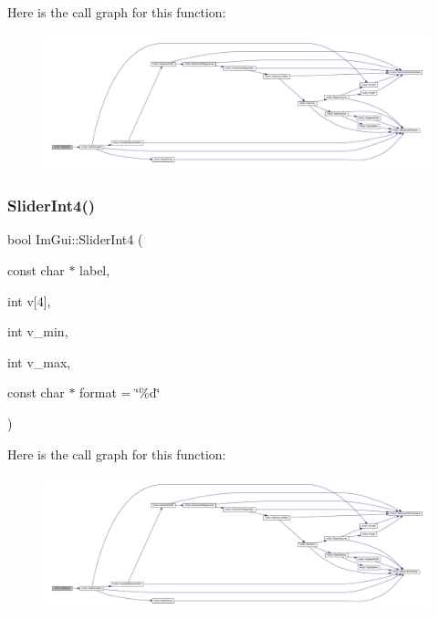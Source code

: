 Here is the call graph for this function\+:
\nopagebreak
\begin{figure}[H]
\begin{center}
\leavevmode
\includegraphics[width=350pt]{namespace_im_gui_a36ecf351f979f7c2c5498846c0cf0b12_cgraph}
\end{center}
\end{figure}
\mbox{\label{namespace_im_gui_a3d98443b7e6844aaae3f90348c4d3499}} 
\subsubsection{\texorpdfstring{Slider\+Int4()}{SliderInt4()}}
{\footnotesize\ttfamily bool Im\+Gui\+::\+Slider\+Int4 (\begin{DoxyParamCaption}\item[{const char $\ast$}]{label,  }\item[{int}]{v\mbox{[}4\mbox{]},  }\item[{int}]{v\+\_\+min,  }\item[{int}]{v\+\_\+max,  }\item[{const char $\ast$}]{format = {\ttfamily \char`\"{}\%d\char`\"{}} }\end{DoxyParamCaption})}

Here is the call graph for this function\+:
\nopagebreak
\begin{figure}[H]
\begin{center}
\leavevmode
\includegraphics[width=350pt]{namespace_im_gui_a3d98443b7e6844aaae3f90348c4d3499_cgraph}
\end{center}
\end{figure}
\mbox{\label{namespace_im_gui_acc71e7cef0759bcff8577e6e37370dcf}} 
